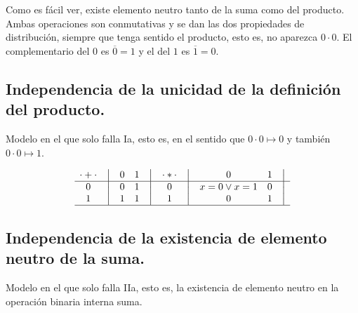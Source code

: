 \documentclass[12pt,a4paper]{article}
\begin{document}
	Como es fácil ver, existe elemento neutro tanto de la suma como del
producto. Ambas operaciones son conmutativas y se dan las dos propiedades de
distribución, siempre que tenga sentido el producto, esto es, no aparezca \(0 \cdot 0\). El complementario del \(0\) es \(\overline 0 = 1\) y el del
\(1\) es \(\overline 1 = 0\).



\subsection{Independencia de la unicidad de la definición del producto.}



Modelo en el que solo falla Ia, esto es, en el sentido que \(0
\cdot 0 \mapsto 0\) y también \(0 \cdot 0 \mapsto 1\).



\[
    \begin{matrix}
        {\cdot + \cdot} & \big{\vert} & {0} & {1} & \big{\vert} \\
        \hline
        {0}             & \big{\vert} & {0} & {1} & \big{\vert} \\
        {1}             & \big{\vert} & {1} & {1} & \big{\vert} \\
        \hline
    \end{matrix}
    \quad
    \begin{matrix}
        {\cdot * \cdot} & \big{\vert} & {0} & {1} & \big{\vert} \\
        \hline
        {0}                   & \big{\vert} & {x=0 \vee x=1} & {0} & \big{\vert} \\
        {1}                   & \big{\vert} & {0} & {1} & \big{\vert} \\
        \hline
    \end{matrix}
\]



\subsection{Independencia de la existencia de elemento neutro de la suma.}



Modelo en el que solo falla IIa, esto es, la existencia de
elemento neutro en la operación binaria interna suma.
\end{document}
